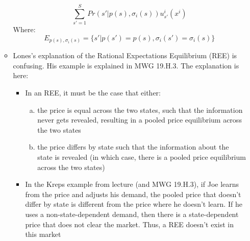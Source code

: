 \documentclass{article}
\newcommand{\red}[1]{{\color{red}#1}}
\begin{document}
\begin{itemize}
\begin{itemize}
				\[
					\sum_{s'=1}^SPr(s'|p(s),\sigma_i(s))u_{s'}^i(x^i)
				\]
				Where:
				\[
					E_{p(s),\sigma_i(s)} = \{s'|p(s')=p(s),\sigma_i(s')=\sigma_i(s)\}
				\]
			\item \red{Lones's explanation of the Rational Expectations Equilibrium (REE) is confusing. His example is explained in MWG 19.H.3. The explanation is here:}
				\begin{itemize}
					\item In an REE, it must be the case that either:
						\begin{enumerate}[(a)]
							\item the price is equal across the two states, such that the information never gets revealed, resulting in a pooled price equilibrium across the two states
							\item the price differs by state such that the information about the state is revealed (in which case, there is a pooled price equilibrium across the two states)
						\end{enumerate}
					\item In the Kreps example from lecture (and MWG 19.H.3), if Joe learns from the price and adjusts his demand, the pooled price that doesn't differ by state is different from the price where he doesn't learn. If he uses a non-state-dependent demand, then there is a state-dependent price that does not clear the market. Thus, a REE doesn't exist in this market
				\end{itemize}
		\end{itemize}
\end{itemize}
		
\end{document}
